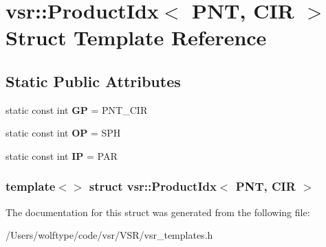 \hypertarget{structvsr_1_1_product_idx_3_01_p_n_t_00_01_c_i_r_01_4}{\section{vsr\-:\-:Product\-Idx$<$ P\-N\-T, C\-I\-R $>$ Struct Template Reference}
\label{structvsr_1_1_product_idx_3_01_p_n_t_00_01_c_i_r_01_4}
}
\subsection*{Static Public Attributes}
\begin{DoxyCompactItemize}
\item 
\hypertarget{structvsr_1_1_product_idx_3_01_p_n_t_00_01_c_i_r_01_4_a9f26a3090332726cc0b577939359bb57}{static const int {\bfseries G\-P} = P\-N\-T\-\_\-\-C\-I\-R}\label{structvsr_1_1_product_idx_3_01_p_n_t_00_01_c_i_r_01_4_a9f26a3090332726cc0b577939359bb57}

\item 
\hypertarget{structvsr_1_1_product_idx_3_01_p_n_t_00_01_c_i_r_01_4_ada7d827936f727d386ae77648b05bd65}{static const int {\bfseries O\-P} = S\-P\-H}\label{structvsr_1_1_product_idx_3_01_p_n_t_00_01_c_i_r_01_4_ada7d827936f727d386ae77648b05bd65}

\item 
\hypertarget{structvsr_1_1_product_idx_3_01_p_n_t_00_01_c_i_r_01_4_a5cde747407a2839255a996a99bbc33aa}{static const int {\bfseries I\-P} = P\-A\-R}\label{structvsr_1_1_product_idx_3_01_p_n_t_00_01_c_i_r_01_4_a5cde747407a2839255a996a99bbc33aa}

\end{DoxyCompactItemize}
\subsubsection*{template$<$$>$ struct vsr\-::\-Product\-Idx$<$ P\-N\-T, C\-I\-R $>$}



The documentation for this struct was generated from the following file\-:\begin{DoxyCompactItemize}
\item 
/\-Users/wolftype/code/vsr/\-V\-S\-R/vsr\-\_\-templates.\-h\end{DoxyCompactItemize}
